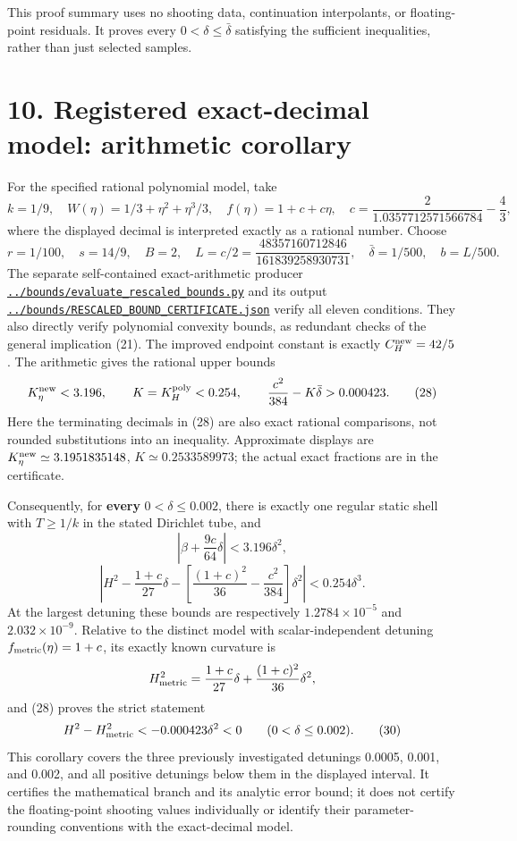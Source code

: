 \documentclass[11pt]{article}
\begin{document}
This proof summary uses no shooting data, continuation interpolants, or
floating-point residuals. It proves every \(0<\delta\leq\bar\delta\)
satisfying the sufficient inequalities, rather than just selected samples.

\section{10. Registered exact-decimal model: arithmetic corollary}\label{registered-exact-decimal-model-arithmetic-corollary}

For the specified rational polynomial model, take
\[
 k=1/9,\quad W(\eta)=1/3+\eta^2+\eta^3/3,
 \quad f(\eta)=1+c+c\eta,
 \quad c=\frac{2}{1.0357712571566784}-\frac43,
\]
where the displayed decimal is interpreted exactly as a rational number.
Choose
\[
 r=1/100,\quad s=14/9,\quad B=2,\quad
 L=c/2=\frac{48357160712846}{161839258930731},\quad
 \bar\delta=1/500,\quad b=L/500.
\]
The separate self-contained exact-arithmetic producer
\href{../bounds/evaluate_rescaled_bounds.py}{\nolinkurl{../bounds/evaluate_rescaled_bounds.py}} and its output
\href{../bounds/RESCALED_BOUND_CERTIFICATE.json}{\nolinkurl{../bounds/RESCALED_BOUND_CERTIFICATE.json}} verify all eleven conditions.
They also directly verify polynomial convexity bounds, as redundant checks
of the general implication (21). The improved endpoint constant is exactly
\(C_H^{\rm new}=42/5\). The arithmetic gives the rational upper bounds
\[
 K_\eta^{\rm new}<3.196,\qquad
 K=K_H^{\rm poly}<0.254,
 \qquad \frac{c^2}{384}-K\bar\delta>0.000423.       \tag{28}
\]
Here the terminating decimals in (28) are also exact rational comparisons,
not rounded substitutions into an inequality. Approximate displays are
\(K_\eta^{\rm new}\simeq3.1951835148\),
\(K\simeq0.2533589973\); the actual exact fractions are in the certificate.

Consequently, for \textbf{every} \(0<\delta\leq0.002\), there is exactly one
regular static shell with \(T\geq1/k\) in the stated Dirichlet tube, and
\[
 \left|\beta+\frac{9c}{64}\delta\right|<3.196\delta^2,
\]
\[
 \left|H^2-\frac{1+c}{27}\delta
    -\left[\frac{(1+c)^2}{36}-\frac{c^2}{384}\right]\delta^2\right|
 <0.254\delta^3.                                  \tag{29}
\]
At the largest detuning these bounds are respectively
\(1.2784\times10^{-5}\) and \(2.032\times10^{-9}\).
Relative to the distinct model with scalar-independent detuning
\(f_{\rm metric}(\eta)=1+c\), its exactly known curvature is
\[
 H_{\rm metric}^2=\frac{1+c}{27}\delta
                   +\frac{(1+c)^2}{36}\delta^2,
\]
and (28) proves the strict statement
\[
 H^2-H_{\rm metric}^2<-0.000423\delta^2<0
 \qquad (0<\delta\leq0.002).                       \tag{30}
\]
This corollary covers the three previously investigated detunings 0.0005,
0.001, and 0.002, and all positive detunings below them in the displayed
interval. It certifies the mathematical branch and its analytic error bound;
it does not certify the floating-point shooting values individually or
identify their parameter-rounding conventions with the exact-decimal model.
\end{document}
